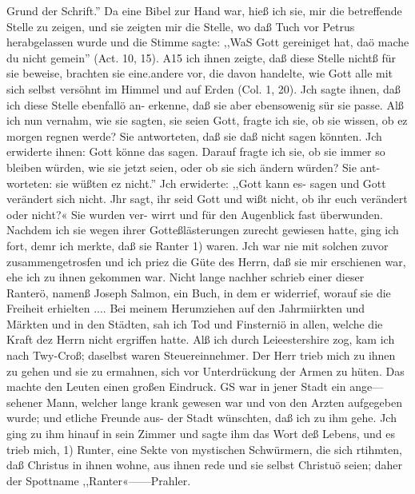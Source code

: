 
Grund der Schrift.'' Da eine Bibel zur Hand war, hieß ich sie,
mir die betreffende Stelle zu zeigen, und sie zeigten mir die Stelle,
wo daß Tuch vor Petrus herabgelassen wurde und die Stimme
sagte: ,,WaS Gott gereiniget hat, daö mache du nicht gemein''
(Act. 10, 15). A15 ich ihnen zeigte, daß diese Stelle nichtß für
sie beweise, brachten sie eine.andere vor, die davon handelte, wie
Gott alle mit sich selbst versöhnt im Himmel und auf Erden
(Col. 1, 20). Jch sagte ihnen, daß ich diese Stelle ebenfallö an-
erkenne, daß sie aber ebensowenig sür sie passe. Alß ich nun
vernahm, wie sie sagten, sie seien Gott, fragte ich sie, ob sie
wissen, ob ez morgen regnen werde? Sie antworteten, daß sie
daß nicht sagen könnten. Jch erwiderte ihnen: Gott könne das
sagen. Darauf fragte ich sie, ob sie immer so bleiben würden,
wie sie jetzt seien, oder ob sie sich ändern würden? Sie ant-
worteten: sie wüßten ez nicht.'' Jch erwiderte: ,,Gott kann es-
sagen und Gott verändert sich nicht. Jhr sagt, ihr seid Gott und
wißt nicht, ob ihr euch verändert oder nicht?« Sie wurden ver-
wirrt und für den Augenblick fast überwunden. Nachdem ich sie
wegen ihrer Gotteßlästerungen zurecht gewiesen hatte, ging ich
fort, demr ich merkte, daß sie Ranter 1) waren. Jch war nie
mit solchen zuvor zusammengetrosfen und ich priez die Güte des
Herrn, daß sie mir erschienen war, ehe ich zu ihnen gekommen
war. Nicht lange nachher schrieb einer dieser Ranterö, namenß
Joseph Salmon, ein Buch, in dem er widerrief, worauf sie die
Freiheit erhielten ....
Bei meinem Herumziehen auf den Jahrmiirkten und Märkten
und in den Städten, sah ich Tod und Finsterniö in allen, welche
die Kraft dez Herrn nicht ergriffen hatte. Alß ich durch Leieestershire
zog, kam ich nach Twy-Croß; daselbst waren Steuereinnehmer.
Der Herr trieb mich zu ihnen zu gehen und sie zu ermahnen,
sich vor Unterdrückung der Armen zu hüten. Das machte den
Leuten einen großen Eindruck. GS war in jener Stadt ein ange—
sehener Mann, welcher lange krank gewesen war und von den
Arzten aufgegeben wurde; und etliche Freunde aus- der Stadt
wünschten, daß ich zu ihm gehe. Jch ging zu ihm hinauf in sein
Zimmer und sagte ihm das Wort deß Lebens, und es trieb mich,
1) Runter, eine Sekte von mystischen Schwürmern, die sich rtihmten,
daß Christus in ihnen wohne, aus ihnen rede und sie selbst Christuö seien;
daher der Spottname ,,Ranter«——Prahler.


